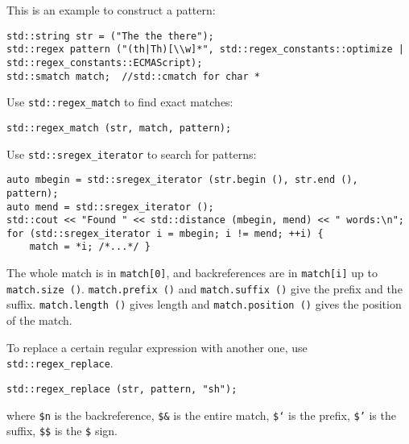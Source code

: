 This is an example to construct a pattern:
\begin{lstlisting}
std::string str = ("The the there");
std::regex pattern ("(th|Th)[\\w]*", std::regex_constants::optimize | std::regex_constants::ECMAScript);
std::smatch match;	//std::cmatch for char *
\end{lstlisting}

Use \texttt{std::regex\_match} to find exact matches:
\begin{lstlisting}
std::regex_match (str, match, pattern);
\end{lstlisting}

Use \texttt{std::sregex\_iterator} to search for patterns:
\begin{lstlisting}
auto mbegin = std::sregex_iterator (str.begin (), str.end (), pattern);
auto mend = std::sregex_iterator ();
std::cout << "Found " << std::distance (mbegin, mend) << " words:\n";
for (std::sregex_iterator i = mbegin; i != mend; ++i) {
	match = *i; /*...*/ }
\end{lstlisting}
The whole match is in \texttt{match[0]}, and backreferences are in \texttt{match[i]} up to \texttt{match.size ()}. \texttt{match.prefix ()} and \texttt{match.suffix ()} give the prefix and the suffix. \texttt{match.length ()} gives length and \texttt{match.position ()} gives the position of the match.

To replace a certain regular expression with another one, use \texttt{std::regex\_replace}.
\begin{lstlisting}
std::regex_replace (str, pattern, "sh");
\end{lstlisting}
where \texttt{\$n} is the backreference, \texttt{\$\&} is the entire match, \texttt{\$`} is the prefix, \texttt{\$'} is the suffix, \texttt{\$\$} is the \texttt{\$} sign.

